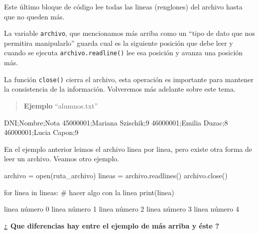 \documentclass[
  letterpaper,
  DIV=11,
  numbers=noendperiod]{scrreprt}
\newenvironment{Shaded}{\begin{snugshade}}{\end{snugshade}}
\newcommand{\BuiltInTok}[1]{\textcolor[rgb]{0.00,0.23,0.31}{#1}}
\newcommand{\CommentTok}[1]{\textcolor[rgb]{0.37,0.37,0.37}{#1}}
\newcommand{\ControlFlowTok}[1]{\textcolor[rgb]{0.00,0.23,0.31}{#1}}
\newcommand{\ExtensionTok}[1]{\textcolor[rgb]{0.00,0.23,0.31}{#1}}
\newcommand{\KeywordTok}[1]{\textcolor[rgb]{0.00,0.23,0.31}{#1}}
\newcommand{\NormalTok}[1]{\textcolor[rgb]{0.00,0.23,0.31}{#1}}
\newcommand{\OperatorTok}[1]{\textcolor[rgb]{0.37,0.37,0.37}{#1}}
\begin{document}
Este último bloque de código lee todas las lineas (renglones) del
archivo hasta que no queden más.

La variable \texttt{archivo}, que mencionamos más arriba como un ``tipo
de dato que nos permitira manipularlo'' guarda cual es la siguiente
posición que debe leer y cuando se ejecuta \texttt{archivo.readline()}
lee esa posición y avanza una posición más.

La función \texttt{close()} cierra el archivo, esta operación es
importante para mantener la consistencia de la información. Volveremos
más adelante sobre este tema.

\begin{quote}
\textbf{Ejemplo} ``alumnos.txt''
\end{quote}

\begin{Shaded}
\begin{Highlighting}[]
\NormalTok{DNI;Nombre;Nota}
\NormalTok{45000001;Mariana Szischik;9}
\NormalTok{46000001;Emilia Duzac;8}
\NormalTok{46000001;Lucia Capon;9}
\end{Highlighting}
\end{Shaded}

En el ejemplo anterior leimos el archivo linea por linea, pero existe
otra forma de leer un archivo. Veamos otro ejemplo.

\begin{Shaded}
\begin{Highlighting}[]
\NormalTok{archivo }\OperatorTok{=} \BuiltInTok{open}\NormalTok{(ruta\_archivo)}
\NormalTok{lineas }\OperatorTok{=}\NormalTok{ archivo.readlines()}
\NormalTok{archivo.close()}

\ControlFlowTok{for}\NormalTok{ linea }\KeywordTok{in}\NormalTok{ lineas:}
  \CommentTok{\# hacer algo con la linea}
  \BuiltInTok{print}\NormalTok{(linea)}
\end{Highlighting}
\end{Shaded}

\begin{Shaded}
\begin{Highlighting}[]
\ExtensionTok{linea}\NormalTok{ número 0 }
\ExtensionTok{linea}\NormalTok{ número 1 }
\ExtensionTok{linea}\NormalTok{ número 2 }
\ExtensionTok{linea}\NormalTok{ número 3 }
\ExtensionTok{linea}\NormalTok{ número 4 }
\end{Highlighting}
\end{Shaded}

\textbf{¿ Que diferencias hay entre el ejemplo de más arriba y éste ?}
\end{document}
